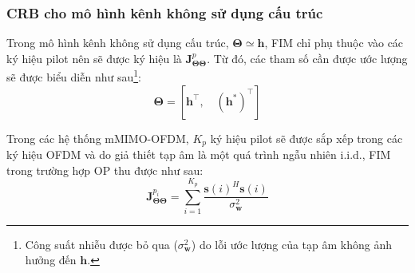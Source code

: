 \subsubsection*{\textbf{CRB cho mô hình kênh không sử dụng cấu trúc}}
Trong mô hình kênh không sử dụng cấu trúc, $\boldsymbol{\Theta} \simeq	 \mathbf{h}$, FIM chỉ phụ thuộc vào các ký hiệu pilot nên sẽ được ký hiệu là $\mathbf{J}_{\boldsymbol{\Theta}\boldsymbol{\Theta}}^p$. Từ đó, các tham số cần được ước lượng sẽ được biểu diễn như sau\footnote{Công suất nhiễu được bỏ qua ($\sigma^2_{\mathbf{w}}$) do lỗi ước lượng của tạp âm không ảnh hưởng đến $\mathbf{h}$.}:
\begin{equation}
    \boldsymbol{\Theta}=\left[\mathbf{h}^{\top},  \quad  \left(\mathbf{h}^{*}\right)^{\top}\right]
\end{equation}

Trong các hệ thống mMIMO-OFDM, $K_p$ ký hiệu pilot sẽ được sắp xếp trong các ký hiệu OFDM và do giả thiết tạp âm là một quá trình ngẫu nhiên i.i.d., FIM trong trường hợp OP thu được như sau:
\begin{equation}
    \label{eq:2.6}
    \mathbf{J}_{\boldsymbol{\Theta} \mathbf{\Theta}}^{p_{i}}= \sum_{i=1}^{K_{p}}  \frac{\mathbf{s}(i)^{H} \mathbf{s}(i)}{\sigma_{\mathbf{w}}^{2}}
\end{equation}

